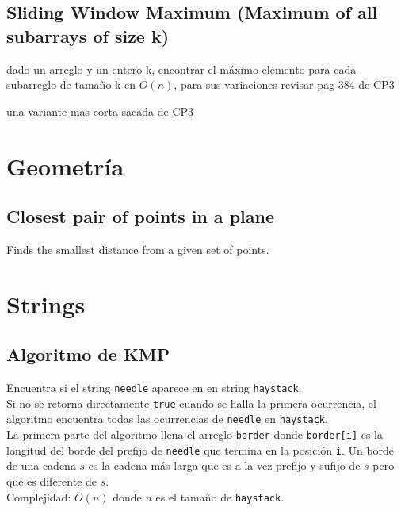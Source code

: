 \documentclass[10pt,letterpaper,twocolumn]{article}
\newcommand{\source}[1]{
  
  \dotfill
}
\begin{document}
    \subsection{Sliding Window Maximum (Maximum of all subarrays of size k)}
    dado un arreglo y un entero k, encontrar el máximo elemento para cada subarreglo de tamaño k en $O(n)$, para sus variaciones revisar pag 384 de CP3
    
    \source{./src/SlidingWindowGeeks.cpp}

una variante mas corta sacada de CP3
	\source{./src/SlidingWindowCP3.cpp}

\section{Geometría}
  \subsection{Closest pair of points in a plane}
    Finds the smallest distance from a given set of points.
    \source{./src/closest_pair_points.cpp}

\section{Strings}
  \subsection{Algoritmo de KMP}
    Encuentra si el string \verb|needle| aparece en en string \verb|haystack|.\\
    Si no se retorna directamente \verb|true| cuando se halla la primera ocurrencia, el algoritmo encuentra todas las ocurrencias de \verb|needle| en \verb|haystack|.\\
    La primera parte del algoritmo llena el arreglo \verb|border| donde \verb|border[i]| es la longitud del borde del prefijo de \verb|needle| que termina en la posición \verb|i|. Un borde de una cadena $s$ es la cadena más larga que es a la vez prefijo y sufijo de $s$ pero que es diferente de $s$.\\
    Complejidad: $O(n)$ donde $n$ es el tamaño de \verb|haystack|.\\
    \source{./src/kmp.cpp}
\end{document}
